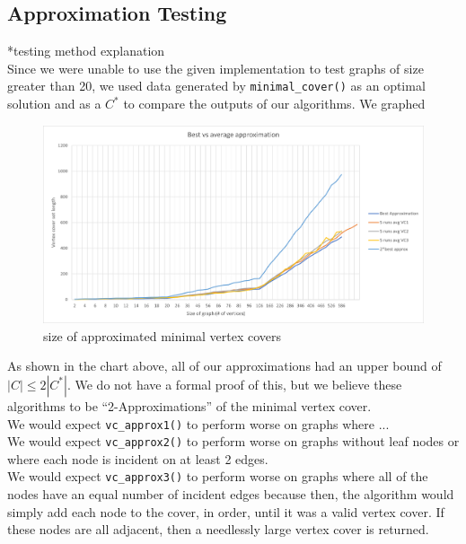 \documentclass[12pt]{article}
\begin{document}
\subsection{Approximation Testing}
*testing method explanation\\
Since we were unable to use the given implementation to test graphs of size greater than 20, we used data generated by \verb+minimal_cover()+ as an optimal solution and as a $C^*$ to compare the outputs of our algorithms. We graphed 
\begin{figure}[H]
\centering
\includegraphics[width=\textwidth,height=\textheight,keepaspectratio]{approximations.png}
\caption{size of approximated minimal vertex covers}
\label{Figure: m1}
\end{figure}
\noindent As shown in the chart above, all of our approximations had an upper bound of $|C|\leq2|C^*|$. We do not have a formal proof of this, but we believe these algorithms to be ``2-Approximations'' of the minimal vertex cover.\\
We would expect \verb+vc_approx1()+ to perform worse on graphs where ...\\
We would expect \verb+vc_approx2()+ to perform worse on graphs without leaf nodes or where each node is incident on at least 2 edges. \\
We would expect \verb+vc_approx3()+ to perform worse on graphs where all of the nodes have an equal number of incident edges because then, the algorithm would simply add each node to the cover, in order, until it was a valid vertex cover. If these nodes are all adjacent, then a needlessly large vertex cover is returned.
\end{document}
